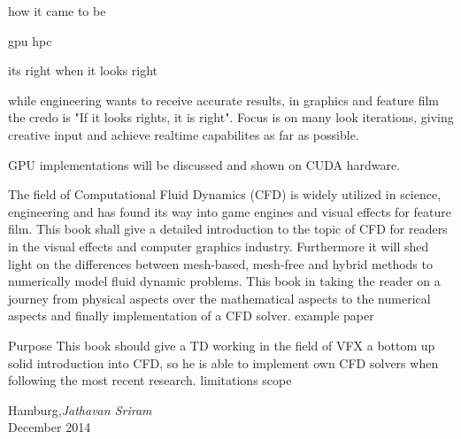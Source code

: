 %
%

\preface





how it came to be

gpu hpc 

its right when it looks right

while engineering wants to receive accurate results, in graphics and feature film the credo is "If it looks rights, it is right". Focus is on many look iterations, giving creative input and achieve realtime capabilites as far as possible. 

GPU implementations will be discussed and shown on CUDA hardware.



The field of Computational Fluid Dynamics (CFD) is widely utilized in science, engineering and has found its way into game engines and visual effects for feature film. This book shall give a detailed introduction to the topic of CFD for readers in the visual effects and computer graphics industry. Furthermore it will shed light on the differences between mesh-based, mesh-free and hybrid methods to numerically model fluid dynamic problems. This book in taking the reader on a journey from physical aspects over the mathematical aspects to the numerical aspects and finally implementation of a CFD solver. example paper


Purpose This book should give a TD working in the field of VFX a bottom up solid introduction into CFD, so he is able to implement own CFD solvers when following the most recent research.
limitations
scope



\vspace{\baselineskip}
\begin{flushright}\noindent
Hamburg,\hfill {\it Jathavan Sriram}\\
December 2014\hfill\\
\end{flushright}



